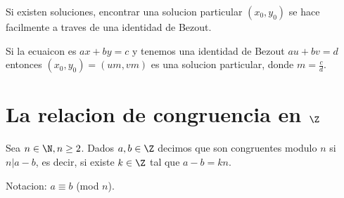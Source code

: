 \begin{remark}
	Si existen soluciones, encontrar una solucion particular \((x_0, y_0 )\) se hace facilmente a traves de una identidad de Bezout.

	Si la ecuaicon es \(ax + by = c \) y tenemos una identidad de Bezout \(au + bv = d \) entonces \((x_0, y_0 ) = (um, vm )\) es una solucion particular, donde \(m = \frac{c}{d }\).
\end{remark}

\section{La relacion de congruencia en \(\Z \)}

\begin{definition}
	Sea \(n \in \N, n \geq 2 \). Dados \(a,b \in \Z \) decimos que son congruentes modulo \(n \) si \(n|a-b \), es decir, si existe \(k \in \Z \) tal que \(a - b = kn \).

	Notacion: \(a \equiv b \) (mod \(n \)).
\end{definition}

